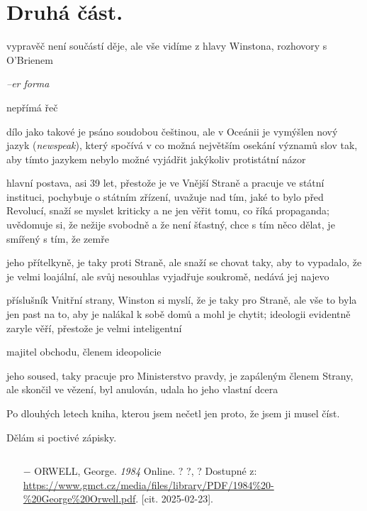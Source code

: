 \documentclass{article}
\begin{document}
\section{Druhá část.}
\begin{description}
    \setlength\itemsep{0.15em}
    \item[vypravěč:] vypravěč není součástí děje, ale vše vidíme z hlavy Winstona, rozhovory s O'Brienem
    \item[vyprávěcí způsoby:] \textit{--er forma}
    \item[typy promluv:] nepřímá řeč
    \item[jazyková stránka:] dílo jako takové je psáno soudobou češtinou, ale v Oceánii je vymýšlen nový jazyk (\textit{newspeak}),
        který spočívá v co možná největším osekání významů slov tak, aby tímto jazykem nebylo možné vyjádřit jakýkoliv protistátní názor
    \item[postavy:]
        \begin{description}
            \setlength\itemsep{0.15em}
           	\item[Winston,] hlavní postava, asi 39 let, přestože je ve Vnější Straně a pracuje ve státní instituci, pochybuje o
            státním zřízení, uvažuje nad tím, jaké to bylo před Revolucí, snaží se myslet kriticky a ne jen
            věřit tomu, co říká propaganda; uvědomuje si, že nežije svobodně a že není šťastný, chce s tím něco dělat,
            je smířený s tím, že zemře
           	\item[Julie,] jeho přítelkyně, je taky proti Straně, ale snaží se chovat taky, aby to vypadalo, že je velmi loajální,
                ale svůj nesouhlas vyjadřuje soukromě, nedává jej najevo
            \item[O`Brien,] příslušník Vnitřní strany, Winston si myslí, že je taky pro Straně, ale vše to byla jen past na to,
                aby je nalákal k sobě domů a mohl je chytit; ideologii evidentně zaryle věří, přestože je velmi inteligentní
            \item[Charrington,] majitel obchodu, členem ideopolicie
            \item[Prasons,] jeho soused, taky pracuje pro Ministerstvo pravdy, je zapáleným členem Strany, ale skončil ve vězení, byl anulován, udala ho jeho vlastní dcera
        \end{description}
    \item[názor:] Po dlouhých letech kniha, kterou jsem nečetl jen proto, že jsem ji musel číst.
    \item[kontext:]  Dělám si poctivé zápisky.
    \item[zdroje:] $ $
    \begin{itemize}
        \setlength\itemsep{0em}
        \item[$-$] ORWELL, George. \textit{1984} Online. ? ?, ? Dostupné z: \url{https://www.gmct.cz/media/files/library/PDF/1984%20-%20George%20Orwell.pdf}. [cit. 2025-02-23].
    \end{itemize}
\end{description}
\end{document}
